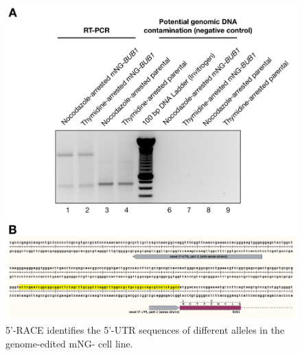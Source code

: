\begin{figure}
    \centering
    \includegraphics[width=\textwidth]{chapters/figures/5RACE.pdf}
    \caption{5'-RACE identifies the 5'-UTR sequences of different  alleles in the genome-edited mNG- cell line.}
    \label{5RACE}
\end{figure}
